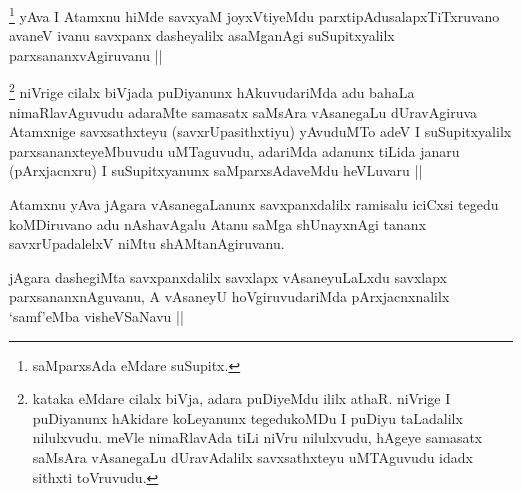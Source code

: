 \begin{artha}
\footnote{saMparxsAda eMdare suSupitx.}
yAva I Atamxnu hiMde savxyaM joyxVtiyeMdu parxtipAdusalapxTiTxruvano avaneV ivanu savxpanx dasheyalilx asaMganAgi suSupitxyalilx parxsananxvAgiruvanu ||
\end{artha}


\begin{artha}
\footnote{kataka eMdare cilalx biVja, adara puDiyeMdu ililx athaR. niVrige I puDiyanunx hAkidare koLeyanunx tegedukoMDu I puDiyu taLadalilx nilulxvudu. meVle nimaRlavAda tiLi niVru nilulxvudu, hAgeye samasatx saMsAra vAsanegaLu dUravAdalilx savxsathxteyu uMTAguvudu idadx sithxti toVruvudu.}
niVrige cilalx biVjada puDiyanunx hAkuvudariMda adu bahaLa nimaRlavAguvudu adaraMte samasatx saMsAra vAsanegaLu dUravAgiruva Atamxnige savxsathxteyu (savxrUpasithxtiyu) yAvuduMTo adeV I suSupitxyalilx parxsananxteyeMbuvudu uMTaguvudu, adariMda adanunx tiLida janaru (pArxjacnxru) I suSupitxyanunx saMparxsAdaveMdu heVLuvaru ||
\end{artha}


\begin{artha}
Atamxnu yAva jAgara vAsanegaLanunx savxpanxdalilx ramisalu iciCxsi tegedu koMDiruvano adu nAshavAgalu Atanu saMga shUnayxnAgi tananx savxrUpadalelxV niMtu shAMtanAgiruvanu.
\end{artha}


\begin{artha}
jAgara dashegiMta savxpanxdalilx savxlapx vAsaneyuLaLxdu savxlapx parxsananxnAguvanu, A vAsaneyU hoVgiruvudariMda pArxjacnxnalilx `samf'eMba visheVSaNavu ||
\end{artha}

